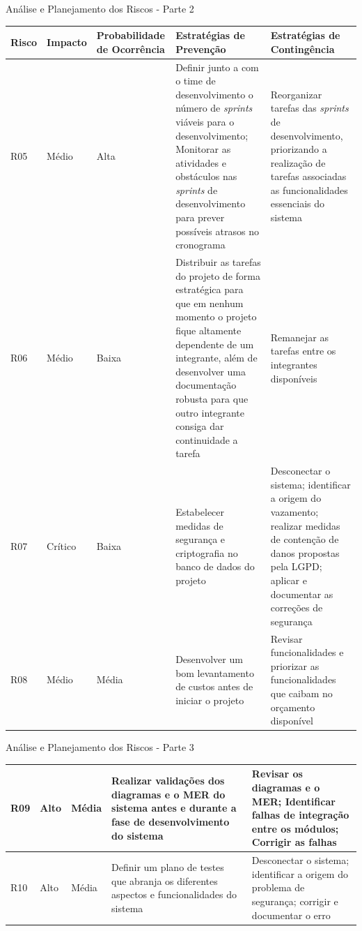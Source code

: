 \documentclass[
	12pt,				%
	openany,			%
	oneside,			%
	a4paper,			%
	english,			%
	french,				%
	spanish,			%
	brazil				%
	]{abntex2}
\begin{document}
% 
\begin{quadro}[H]
	\caption{Análise e Planejamento dos Riscos - Parte 2}
	\label{analise_riscos_2} 
	\begin{tabular}{|>{\centering\arraybackslash}m{1cm}|>{\centering\arraybackslash}m{1.8cm}|>{\centering\arraybackslash}m{3cm}|>{\raggedright\arraybackslash}m{4.2cm}|>{\raggedright\arraybackslash}m{4.2cm}|}
		\hline
		\textbf{Risco} & \textbf{Impacto} & \textbf{Probabilidade de \newline Ocorrência} & \textbf{Estratégias de \newline Prevenção} & \textbf{Estratégias de \newline Contingência}\\
		\hline	
		R05 & Médio & 	Alta &
		Definir junto a com o time de desenvolvimento o número de \textit{sprints} viáveis para o desenvolvimento; Monitorar as atividades e obstáculos nas \textit{sprints} de desenvolvimento para prever possíveis atrasos no cronograma & Reorganizar tarefas das \textit{sprints} de desenvolvimento, priorizando a realização de tarefas associadas as funcionalidades essenciais do sistema \\
		\hline
		R06 & Médio & Baixa & Distribuir as tarefas do projeto de forma estratégica  para que em nenhum momento o projeto fique altamente dependente de um integrante, além de desenvolver uma documentação robusta para que outro integrante consiga dar continuidade a tarefa & Remanejar as tarefas entre os integrantes disponíveis \\
		\hline
		R07 & Crítico & Baixa & Estabelecer medidas de segurança e criptografia no banco de dados do projeto & Desconectar o sistema; identificar a origem do vazamento; realizar medidas de contenção de danos propostas pela LGPD; aplicar e documentar as correções de segurança \\
		\hline
		R08 & Médio & Média & Desenvolver um bom levantamento de custos antes de iniciar o projeto & Revisar funcionalidades e priorizar as funcionalidades que caibam no orçamento disponível \\
		\hline
	\end{tabular}
	\fonte{Elaborado pelos autores.}
\end{quadro}
%
\begin{quadro}[H]
	\caption{Análise e Planejamento dos Riscos - Parte 3}
	\label{analise_riscos_3} 
	\begin{tabular}{|>{\centering\arraybackslash}m{1cm}|>{\centering\arraybackslash}m{1.8cm}|>{\centering\arraybackslash}m{3cm}|>{\raggedright\arraybackslash}m{4.2cm}|>{\raggedright\arraybackslash}m{4.2cm}|}
		\hline
		R09 & Alto & Média & Realizar validações dos diagramas e o MER do sistema antes e durante a fase de desenvolvimento do sistema & Revisar os diagramas e o MER; Identificar falhas de integração entre os módulos; Corrigir as falhas \\
		\hline
		R10 & Alto & Média & Definir um plano de testes que abranja os diferentes aspectos e funcionalidades do sistema & Desconectar o sistema; identificar a origem do problema de segurança; corrigir e documentar o erro \\ \hline
	\end{tabular}
\end{quadro}
%
\end{document}
